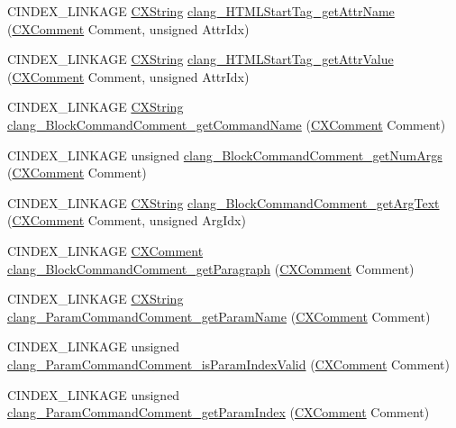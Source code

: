 \begin{DoxyCompactItemize}
\item 
C\+I\+N\+D\+E\+X\+\_\+\+L\+I\+N\+K\+A\+GE \hyperlink{structCXString}{C\+X\+String} \hyperlink{group__CINDEX__COMMENT_ga4bdf958af343477fc70eb2b4822cd006}{clang\+\_\+\+H\+T\+M\+L\+Start\+Tag\+\_\+get\+Attr\+Name} (\hyperlink{structCXComment}{C\+X\+Comment} Comment, unsigned Attr\+Idx)
\item 
C\+I\+N\+D\+E\+X\+\_\+\+L\+I\+N\+K\+A\+GE \hyperlink{structCXString}{C\+X\+String} \hyperlink{group__CINDEX__COMMENT_gae674a07af38d28d67941c1c54909c5e8}{clang\+\_\+\+H\+T\+M\+L\+Start\+Tag\+\_\+get\+Attr\+Value} (\hyperlink{structCXComment}{C\+X\+Comment} Comment, unsigned Attr\+Idx)
\item 
C\+I\+N\+D\+E\+X\+\_\+\+L\+I\+N\+K\+A\+GE \hyperlink{structCXString}{C\+X\+String} \hyperlink{group__CINDEX__COMMENT_ga8fdde998537370477362a4f84bc03420}{clang\+\_\+\+Block\+Command\+Comment\+\_\+get\+Command\+Name} (\hyperlink{structCXComment}{C\+X\+Comment} Comment)
\item 
C\+I\+N\+D\+E\+X\+\_\+\+L\+I\+N\+K\+A\+GE unsigned \hyperlink{group__CINDEX__COMMENT_gacb447968ce9efdfdabbfca8918540cdf}{clang\+\_\+\+Block\+Command\+Comment\+\_\+get\+Num\+Args} (\hyperlink{structCXComment}{C\+X\+Comment} Comment)
\item 
C\+I\+N\+D\+E\+X\+\_\+\+L\+I\+N\+K\+A\+GE \hyperlink{structCXString}{C\+X\+String} \hyperlink{group__CINDEX__COMMENT_ga9faf08601d88c809a9a97a9826051990}{clang\+\_\+\+Block\+Command\+Comment\+\_\+get\+Arg\+Text} (\hyperlink{structCXComment}{C\+X\+Comment} Comment, unsigned Arg\+Idx)
\item 
C\+I\+N\+D\+E\+X\+\_\+\+L\+I\+N\+K\+A\+GE \hyperlink{structCXComment}{C\+X\+Comment} \hyperlink{group__CINDEX__COMMENT_gac6f2ffc8fdbe9394bd4bb7d54327c968}{clang\+\_\+\+Block\+Command\+Comment\+\_\+get\+Paragraph} (\hyperlink{structCXComment}{C\+X\+Comment} Comment)
\item 
C\+I\+N\+D\+E\+X\+\_\+\+L\+I\+N\+K\+A\+GE \hyperlink{structCXString}{C\+X\+String} \hyperlink{group__CINDEX__COMMENT_gaffd7aaf697c5eb3a3d2b508b5d806763}{clang\+\_\+\+Param\+Command\+Comment\+\_\+get\+Param\+Name} (\hyperlink{structCXComment}{C\+X\+Comment} Comment)
\item 
C\+I\+N\+D\+E\+X\+\_\+\+L\+I\+N\+K\+A\+GE unsigned \hyperlink{group__CINDEX__COMMENT_ga92e6422da2a3e428b4452a3e8955ff76}{clang\+\_\+\+Param\+Command\+Comment\+\_\+is\+Param\+Index\+Valid} (\hyperlink{structCXComment}{C\+X\+Comment} Comment)
\item 
C\+I\+N\+D\+E\+X\+\_\+\+L\+I\+N\+K\+A\+GE unsigned \hyperlink{group__CINDEX__COMMENT_gad9d1dc9ebb52dcc9cb7da8ca4c23332a}{clang\+\_\+\+Param\+Command\+Comment\+\_\+get\+Param\+Index} (\hyperlink{structCXComment}{C\+X\+Comment} Comment)

\end{DoxyCompactItemize}
